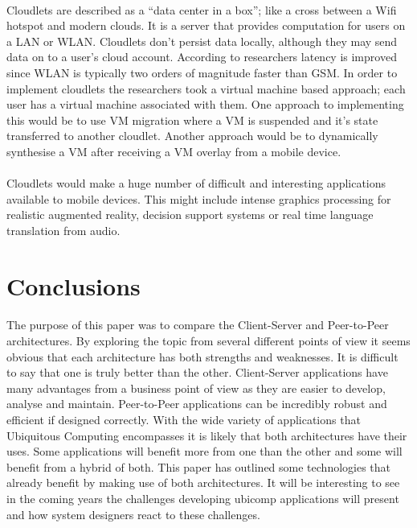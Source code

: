 \documentclass[11pt]{amsart}
\begin{document}
\paragraph{}
Cloudlets are described as a ``data center in a box''; like a cross between a Wifi hotspot and modern clouds. It is a server that provides computation for users on a LAN or WLAN. Cloudlets don't persist data locally, although they may send data on to a user's cloud account. According to researchers latency is improved since WLAN is typically two orders of magnitude faster than GSM. In order to implement cloudlets the researchers took a virtual machine based approach; each user has a virtual machine associated with them. One approach to implementing this would be to use VM migration where a VM is suspended and it's state transferred to another cloudlet. Another approach would be to dynamically synthesise a VM after receiving a VM overlay from a mobile device. 
\paragraph{}
Cloudlets would make a huge number of difficult and interesting applications available to mobile devices. This might include intense graphics processing for realistic augmented reality, decision support systems or real time language translation from audio.
\paragraph{}

\section{Conclusions}
\paragraph{}
The purpose of this paper was to compare the Client-Server and Peer-to-Peer architectures. By exploring the topic from several different points of view it seems obvious that each architecture has both strengths and weaknesses. It is difficult to say that one is truly better than the other. Client-Server applications have many advantages from a business point of view as they are easier to develop, analyse and maintain. Peer-to-Peer applications can be incredibly robust and efficient if designed correctly. With the wide variety of applications that Ubiquitous Computing encompasses it is likely that both architectures have their uses. Some applications will benefit more from one than the other and some will benefit from a hybrid of both. This paper has outlined some technologies that already benefit by making use of both architectures. It will be interesting to see in the coming years the challenges developing ubicomp applications will present and how system designers react to these challenges. 


\end{document}
